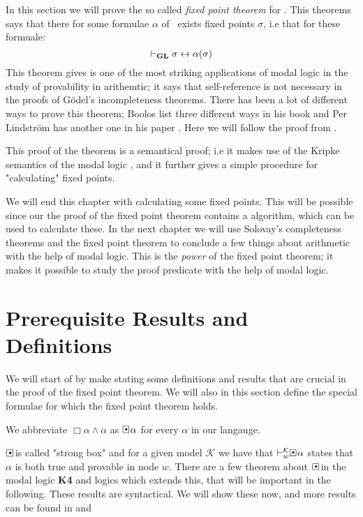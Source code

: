 \documentclass[../main.tex]{subfiles}
\begin{document}
In this section we will prove the so called \textit{fixed point theorem} for
\GL.  This theorems says that there for some formulae $\alpha$  of \GL\ exists fixed
points $\sigma$, i.e that for these formuale:
\[\vdash_{\text{\textbf{GL}}}\sigma\leftrightarrow\alpha(\sigma)\]
This theorem gives is one of the most striking applications of modal logic in
the study of provability in arithemtic; it says that self-reference is not
necessary in the proofs of Gödel's incompleteness theorems.
There has been a lot of different ways to prove this theorem; Boolos
list three different ways in his book \parencite{Boolos1993} and Per Lindström has
another one in his paper \parencite{Lind1996}. Here we
will follow the proof from \parencite{Olson1990}.

This proof of the theorem is a semantical proof; i.e it makes use of the
Kripke semantics of the modal logic \GL, and it further gives a simple
procedure for "calculating" fixed points.

We will end this chapter with calculating some fixed points. This will be
possible since our the proof of the fixed point theorem contains a algorithm,
which can be used to calculate these. In the next chapter we will use Solovay's
completeness theorems and the fixed point theorem to conclude a few things
about arithmetic with the help of modal logic. This is the \textit{power} of
the fixed point theorem; it makes it possible to study the proof predicate with
the help of modal logic.

\section{Prerequisite Results and Definitions}

We will start of by make stating some definitions and results that are crucial
in the proof of the fixed point theorem. We will also in this section define
the special formulae for which the fixed point theorem holds.

\begin{defi}
	We abbreviate $\Box\alpha\wedge\alpha$ as $\sBox\alpha$ for every
	$\alpha$ in our langauge.
\end{defi}
$\sBox$ is called "strong box" and for a given model $\mathcal{K}$ we have that
$\vdash_w^\mathcal{K}\sBox \alpha$ states that $\alpha$ is both true and
provable in node $w$. There are a few theorem about $\sBox$ in the modal logic
\textbf{K4} and logics which extends this, that will be
important in the following. These results are syntactical. We will show these
now, and more results can be found in \parencite{Smor1985} and \cite{Boolos1993}
\end{document}
